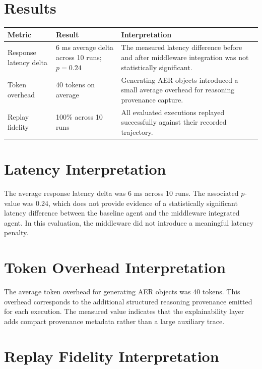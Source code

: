 \documentclass[11pt,a4paper]{article}
\begin{document}
\section{Results}

\begin{table}[h]
\centering
\begin{tabularx}{\textwidth}{@{}p{}p{}Y@{}}
\toprule
\textbf{Metric} & \textbf{Result} & \textbf{Interpretation} \\
\midrule
Response latency delta &
6 ms average delta across 10 runs; $p = 0.24$ &
The measured latency difference before and after middleware integration was
not statistically significant. \\
Token overhead &
40 tokens on average &
Generating AER objects introduced a small average overhead for reasoning
provenance capture. \\
Replay fidelity &
100\% across 10 runs &
All evaluated executions replayed successfully against their recorded
trajectory. \\
\bottomrule
\end{tabularx}
\end{table}

\section{Latency Interpretation}

The average response latency delta was 6 ms across 10 runs. The associated
$p$-value was 0.24, which does not provide evidence of a statistically
significant latency difference between the baseline agent and the middleware
integrated agent. In this evaluation, the middleware did not introduce a
meaningful latency penalty.

\section{Token Overhead Interpretation}

The average token overhead for generating AER objects was 40 tokens. This
overhead corresponds to the additional structured reasoning provenance emitted
for each execution. The measured value indicates that the explainability layer
adds compact provenance metadata rather than a large auxiliary trace.

\section{Replay Fidelity Interpretation}
\end{document}
